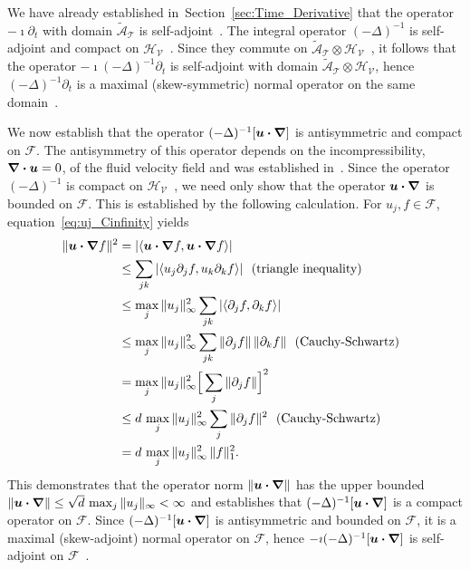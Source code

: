 \documentclass[leqno,onefignum,onetabnum]{siamltex1213}
\newcommand{\secref}[1]{Section~\ref{#1}}
\newcommand{\Tc}{\mathcal{T}}
\newcommand{\Vc}{\mathcal{V}}
\newcommand{\Hs}{\mathscr{H}}
\newcommand{\As}{\mathscr{A}}
\newcommand{\Fs}{\mathscr{F}}
\newcommand\bnabla{\mbox{\boldmath${\nabla}$}}
\providecommand\bcdot{\boldsymbol{\cdot}}
\newcommand{\vecu}{\boldsymbol{u}}
\begin{document}
We have already established in~\secref{sec:Time_Derivative} that the
operator $-\imath\partial_t$ with domain $\tilde{\As}_{\Tc}$ is
self-adjoint~\cite{Stone:64}. The integral operator $(-\Delta)^{-1}$ 
is self-adjoint and compact on
$\Hs_{\Vc}$~\cite{Stakgold:BVP:2000}. Since they commute on
$\tilde{\As}_{\Tc}\otimes\Hs_{\Vc}$~\cite{Folland:99:RealAnalysis}, it 
follows that the operator $-\imath(-\Delta)^{-1}\partial_t$ is self-adjoint with domain
$\tilde{\As}_{\Tc}\otimes\Hs_{\Vc}$, hence $(-\Delta)^{-1}\partial_t$ is a maximal
(skew-symmetric) normal operator on the same domain~\cite{Stone:64}.




We now establish that the operator $(-\Delta)^{-1}[\vecu\bcdot\bnabla]$
is antisymmetric and compact on $\Fs$. The antisymmetry of this
operator depends on the incompressibility, $\bnabla\bcdot\vecu=0$, of
the fluid velocity field and was established
in~\cite{Bhattacharya:AAP:1999:951,Pavliotis:PHD_Thesis}. 
Since the operator $(-\Delta)^{-1}$ is compact on
$\Hs_{\Vc}$~\cite{Stakgold:BVP:2000}, we need only show that the
operator $\vecu\bcdot\bnabla$ is bounded on $\Fs$. This is established
by the following calculation. For $u_j,f\in\Fs$,
equation~\eqref{eq:uj_Cinfinity}  yields 
%
\begin{align}\label{eq:Second_Bound_A}
  \|\vecu\bcdot\bnabla f\|^2&=|\langle\vecu\bcdot\bnabla f,\vecu\bcdot\bnabla f\rangle| 
         \\
         &\leq\sum_{jk}|\langle u_j\partial_jf,u_k\partial_kf\rangle |~\text{ (triangle inequality) }
         \notag\\
         &\leq\max_j\|u_j\|_\infty^2\sum_{jk}|\langle\partial_jf,\partial_kf\rangle|
         \notag\\
         &\leq\max_j\|u_j\|_\infty^2\sum_{jk}\|\partial_jf\|\,\|\partial_kf\|
              ~\text{ (Cauchy-Schwartz) }~
         \notag\\
         &=\max_j\|u_j\|_\infty^2\Big[\sum_{j}\|\partial_jf\|\Big]^2
         \notag\\
         &\leq d\,\max_j\|u_j\|_\infty^2\sum_{j}\|\partial_jf\|^2
         ~\text{ (Cauchy-Schwartz) }~
         \notag\\
         &=d\,\max_j\|u_j\|_\infty^2\,\|f\|_1^2.
         \notag
\end{align}
%
This demonstrates that the operator norm $\|\vecu\bcdot\bnabla\|$ has
the upper bounded $\|\vecu\bcdot\bnabla\|\leq\sqrt{d}\,\max_j\|u_j\|_\infty<\infty$ and
establishes that $(-\Delta)^{-1}[\vecu\bcdot\bnabla]$ is a compact operator
on $\Fs$. Since $(-\Delta)^{-1}[\vecu\bcdot\bnabla]$ is
antisymmetric and bounded on $\Fs$, it is a maximal (skew-adjoint)
normal operator on $\Fs$, hence $-\imath(-\Delta)^{-1}[\vecu\bcdot\bnabla]$ is
self-adjoint on $\Fs$~\cite{Stone:64}. 
\end{document}
